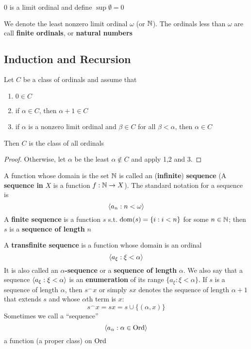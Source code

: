 \documentclass[11pt]{article}
\begin{document}
0 is a limit ordinal and define \(\sup\emptyset=0\)

\begin{definition}
We denote the least nonzero limit ordinal \(\omega\) (or \(\mathbb{N}\)). The ordinals less than \(\omega\) are call
\textbf{finite ordinals}, or \textbf{natural numbers}
\end{definition}

\subsection{Induction and Recursion}
\label{sec:org8edf82d}
\begin{theorem}
Let \(C\) be a class of ordinals and assume that
\begin{enumerate}
\item \(0\in C\)
\item if \(\alpha\in C\), then \(\alpha+1\in C\)
\item if \(\alpha\) is a nonzero limit ordinal and \(\beta\in C\) for all \(\beta<\alpha\), then \(\alpha\in C\)
\end{enumerate}


Then \(C\) is the class of all ordinals
\end{theorem}

\begin{proof}
Otherwise, let \(\alpha\) be the least \(\alpha\not\in C\) and apply 1,2 and 3.
\end{proof}

A function whose domain is the set \(\mathbb{N}\) is called an (\textbf{infinite}) \textbf{sequence} (A \textbf{sequence in} \(X\)
is a function \(f:\mathbb{N}\to X\)). The standard notation for a sequence is
\begin{equation*}
\langle a_n:n<\omega\rangle
\end{equation*}
A \textbf{finite sequence} is a function \(s\) s.t. \(\operatorname{dom}(s)=\{i:i<n\}\) for some \(n\in\mathbb{N}\); then \(s\) is a
\textbf{sequence  of length} \(n\)

A \textbf{transfinite sequence} is a function whose domain is an ordinal
\begin{equation*}
\langle a_\xi:\xi<\alpha\rangle
\end{equation*}
It is also called an \textbf{\(\alpha\)-sequence} or a \textbf{sequence of length} \(\alpha\). We also say that a
sequence \(\langle a_\xi:\xi<\alpha\rangle\) is an \textbf{enumeration} of its range \(\{a_\xi:\xi<\alpha\}\). If \(s\) is a sequence of
length \(\alpha\), then \(s^\smallfrown x\) or simply \(sx\) denotes the sequence of length \(\alpha+1\) that
extends \(s\) and whose \(\alpha\)th term is \(x\):
\begin{equation*}
s^\smallfrown x=sx=s\cup\{(\alpha,x)\}
\end{equation*}
Sometimes we call a ``sequence''
\begin{equation*}
\langle a_\alpha:\alpha\in\text{Ord}\rangle
\end{equation*}
a function (a proper class) on \(\text{Ord}\)
\end{document}
